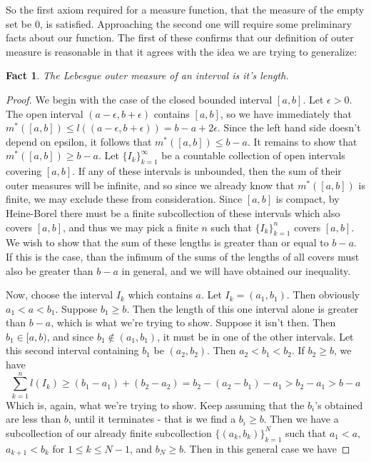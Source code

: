 \documentclass{article}
\theoremstyle{definition}
\theoremstyle{plain}
\theoremstyle{theorem}
\newtheorem{fact}{Fact}[section]
\begin{document}
So the first axiom required for a measure function, that the measure of the empty set be $0$, is satisfied. Approaching the second one will require some preliminary facts about our function. The first of these confirms that our definition of outer measure is reasonable in that it agrees with the idea we are trying to generalize:
\begin{fact}
	The Lebesgue outer measure of an interval is it's length.
\end{fact}
\begin{proof}
	We begin with the case of the closed bounded interval $[a,b]$. Let $\epsilon > 0$. The open interval $(a-\epsilon,b+\epsilon)$ contains $[a,b]$, so we have immediately that $m^*([a,b]) \leq l((a-\epsilon,b+\epsilon)) = b-a+2\epsilon$. Since the left hand side doesn't depend on epsilon, it follows that $m^*([a,b]) \leq b-a$. It remains to show that $m^*([a,b]) \geq b-a$. Let $\{I_k\}_{k=1}^{\infty}$ be a countable collection of open intervals covering $[a,b]$. If any of these intervals is unbounded, then the sum of their outer measures will be infinite, and so since we already know that $m^*([a,b])$ is finite, we may exclude these from consideration. Since $[a,b]$ is compact, by Heine-Borel there must be a finite subcollection of these intervals which also covers $[a,b]$, and thus we may pick a finite $n$ such that $\{I_k\}_{k=1}^n$ covers $[a,b]$. We wish to show that the sum of these lengths is greater than or equal to $b-a$. If this is the case, than the infimum of the sums of the lengths of all covers must also be greater than $b-a$ in general, and we will have obtained our inequality. \par
Now, choose the interval $I_k$ which contains $a$. Let $I_k = (a_1,b_1)$. Then obviously $a_1 < a < b_1$. Suppose $b_1 \geq b$. Then the length of this one interval alone is greater than $b-a$, which is what we're trying to show. Suppose it isn't then. Then $b_1 \in [a,b)$, and since $b_1 \notin (a_1,b_1)$, it must be in one of the other intervals. Let this second interval containing $b_1$ be $(a_2,b_2)$. Then $a_2 < b_1 < b_2$. If $b_2 \geq b$, we have 
\[ \sum_{k=1}^n l(I_k) \geq (b_1 - a_1) + (b_2-a_2) = b_2-(a_2-b_1)-a_1 > b_2-a_1 > b-a \]
Which is, again, what we're trying to show. Keep assuming that the $b_i$'s obtained are less than $b$, until it terminates - that is we find a $b_i \geq b$. Then we have a subcollection of our already finite subcollection $\{(a_k,b_k)\}_{k=1}^N$ such that $a_1 < a$, $a_{k+1} < b_k$ for $1 \leq k \leq N-1$, and $b_N \geq b$. Then in this general case we have

\end{proof}
\end{document}
